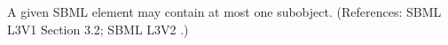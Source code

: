 A given SBML element may contain at most one \Annotation subobject.
(References: SBML L3V1 Section 3.2; SBML L3V2 .)

